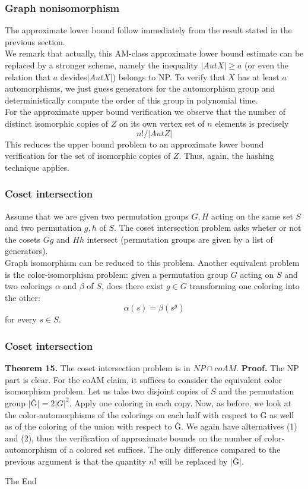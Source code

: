 \documentclass{beamer}
\begin{document}
\begin{frame}
\frametitle{Graph nonisomorphism}
The approximate lower bound follow immediately from the result stated in the previous section. \\
We remark that actually, this AM-class approximate lower bound estimate can be replaced by a stronger scheme, namely the inequality $|Aut X| \geq a$ (or even the relation that $a$ devides$|Aut X|$) belongs to NP. To verify that $X$ has at least $a$ automorphisms, we just guess generators for the automorphism group and deterministically compute the order of this group in polynomial time.\\
For the approximate upper bound verification we observe that the number of distinct isomorphic copies of $Z$ on its own vertex set of $n$ elements is precisely $$n! / |Aut Z|$$
This reduces the upper bound problem to an approximate lower bound verification for the set of isomorphic copies of $Z$. Thus, again, the hashing technique applies.
\end{frame}

\begin{frame}
\frametitle{Coset intersection}
Assume that we are given two permutation groups $G, H$ acting on the same set $S$ and two permutation $g, h$ of $S$. The coset intersection problem asks wheter or not the cosets $Gg$ and $Hh$ intersect (permutation groups are given by a list of generators).\\
Graph isomorphism can be reduced to this problem. Another equivalent problem is the color-isomorphism problem: given a permutation group $G$ acting on $S$ and two colorings $\alpha$ and $\beta$ of $S$, does there exist $g \in G$ transforming one coloring into the other:$$\alpha(s) = \beta(s^g)$$
for every $s \in S$.
\end{frame}

\begin{frame}
\frametitle{Coset intersection}
\textbf{Theorem 15.} The coset intersection problem is in $NP \cap coAM$.
\textbf{Proof.} The NP part is clear. For the coAM claim, it suffices to consider the equivalent color isomorphism problem. Let us take two disjoint copies of $S$ and the permutation group $|$\^{G}$| = 2|G|^2$. Apply one coloring in each copy. Now, as before, we look at the color-automorphisms of the colorings on each half with respect to G as well as of the coloring of the union with respect to \^{G}. We again have alternatives (1) and (2), thus the verification of approximate bounds on the number of color-automorphism of a colored set suffices. The only difference compared to the previous argument is that the quantity $n!$ will be replaced by $|$\^{G}$|$.

\end{frame}

\begin{frame}
\Huge{\centerline{The End}}
\end{frame}

\end{document}
